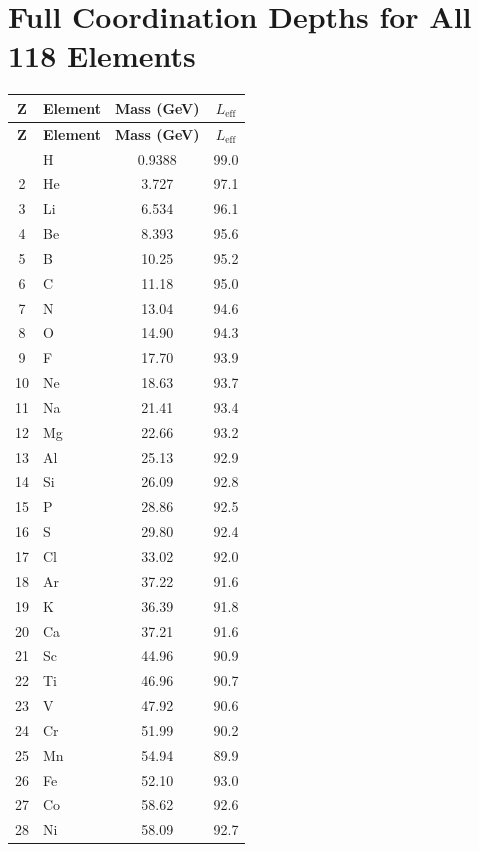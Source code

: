 \documentclass[11pt,a4paper]{article}
\begin{document}
	\section*{Full Coordination Depths for All 118 Elements}
	\label{sec:full_Leff}
	\begin{longtable}{c l c c}
		\toprule
		\textbf{Z} & \textbf{Element} & \textbf{Mass (GeV)} & \textbf{\(L_{\mathrm{eff}}\)} \\
		\midrule
		\endfirsthead
		\toprule
		\textbf{Z} & \textbf{Element} & \textbf{Mass (GeV)} & \textbf{\(L_{\mathrm{eff}}\)} \\
		\midrule
		\endhead
		\bottomrule
		\endfoot
		1  & H   & 0.9388 & 99.0 \\
		2  & He  & 3.727  & 97.1 \\
		3  & Li  & 6.534  & 96.1 \\
		4  & Be  & 8.393  & 95.6 \\
		5  & B   & 10.25  & 95.2 \\
		6  & C   & 11.18  & 95.0 \\
		7  & N   & 13.04  & 94.6 \\
		8  & O   & 14.90  & 94.3 \\
		9  & F   & 17.70  & 93.9 \\
		10 & Ne  & 18.63  & 93.7 \\
		11 & Na  & 21.41  & 93.4 \\
		12 & Mg  & 22.66  & 93.2 \\
		13 & Al  & 25.13  & 92.9 \\
		14 & Si  & 26.09  & 92.8 \\
		15 & P   & 28.86  & 92.5 \\
		16 & S   & 29.80  & 92.4 \\
		17 & Cl  & 33.02  & 92.0 \\
		18 & Ar  & 37.22  & 91.6 \\
		19 & K   & 36.39  & 91.8 \\
		20 & Ca  & 37.21  & 91.6 \\
		21 & Sc  & 44.96  & 90.9 \\
		22 & Ti  & 46.96  & 90.7 \\
		23 & V   & 47.92  & 90.6 \\
		24 & Cr  & 51.99  & 90.2 \\
		25 & Mn  & 54.94  & 89.9 \\
		26 & Fe  & 52.10  & 93.0 \\
		27 & Co  & 58.62  & 92.6 \\
		28 & Ni  & 58.09  & 92.7 \\

\end{longtable}
\end{document}
